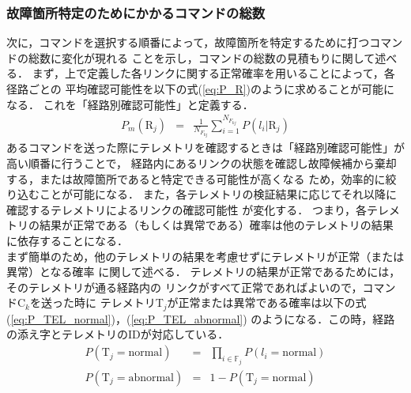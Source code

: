 \documentclass[11pt]{jsreport}
\begin{document}
\subsubsection{故障箇所特定のためにかかるコマンドの総数}
次に，コマンドを選択する順番によって，故障箇所を特定するために打つコマンドの総数に変化が現れる
ことを示し，コマンドの総数の見積もりに関して述べる．
まず，上で定義した各リンクに関する正常確率を用いることによって，各径路ごとの
平均確認可能性を以下の式(\ref{eq:P_R})のように求めることが可能になる．%
これを「経路別確認可能性」と定義する．
\begin{eqnarray}
   P_m(\text{R}_j)  &=& \frac{1}{N_{F_{kj}}}\sum_{i=1}^{N_{F_{kj}}}P(l_i|\text{R}_j) \label{eq:P_R}
\end{eqnarray}
あるコマンドを送った際にテレメトリを確認するときは「経路別確認可能性」が高い順番に行うことで，
経路内にあるリンクの状態を確認し故障候補から棄却する，または故障箇所であると特定できる可能性が高くなる
ため，効率的に絞り込むことが可能になる．
また，各テレメトリの検証結果に応じてそれ以降に確認するテレメトリによるリンクの確認可能性
が変化する．%
つまり，各テレメトリの結果が正常である（もしくは異常である）確率は他のテレメトリの結果
に依存することになる．\\
まず簡単のため，他のテレメトリの結果を考慮せずにテレメトリが正常（または異常）となる確率
に関して述べる．
テレメトリの結果が正常であるためには，そのテレメトリが通る経路内の
リンクがすべて正常であればよいので，コマンドC$_k$を送った時に
テレメトリT$_j$が正常または異常である確率は以下の式(\ref{eq:P_TEL_normal})，(\ref{eq:P_TEL_abnormal})
のようになる．この時，経路の添え字とテレメトリのIDが対応している．
\begin{eqnarray}
   P(\text{T}_j = \text{normal}) &=& \prod_{i\in\mathbb{F}_j} P(l_i = \text{normal}) \label{eq:P_TEL_normal}\\
   P(\text{T}_j = \text{abnormal}) &=& 1 - P(\text{T}_j = \text{normal}) \label{eq:P_TEL_abnormal}
\end{eqnarray}
\end{document}
